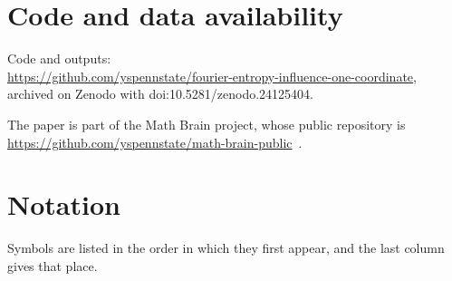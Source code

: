 \documentclass[11pt]{amsart}
\theoremstyle{remark}
\begin{document}
\section*{Code and data availability}
Code and outputs:\\
\url{https://github.com/yspennstate/fourier-entropy-influence-one-coordinate},\\
archived on Zenodo with doi:10.5281/zenodo.24125404.

The paper is part of the Math Brain project, whose public repository is
\url{https://github.com/yspennstate/math-brain-public}~\cite{MathBrainRepo}.

\appendix
\section{Notation}\label{app:notation}

Symbols are listed in the order in which they first appear, and the last column gives that place.
\end{document}
